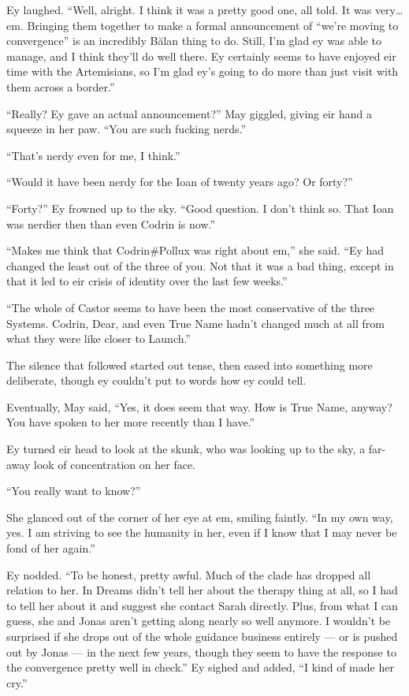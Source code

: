 Ey laughed. ``Well, alright. I think it was a pretty good one, all told. It was very\ldots em. Bringing them together to make a formal announcement of ``we're moving to convergence'' is an incredibly Bălan thing to do. Still, I'm glad ey was able to manage, and I think they'll do well there. Ey certainly seems to have enjoyed eir time with the Artemisians, so I'm glad ey's going to do more than just visit with them across a border.''

``Really? Ey gave an actual announcement?'' May giggled, giving eir hand a squeeze in her paw. ``You are such fucking nerds.''

``That's nerdy even for me, I think.''

``Would it have been nerdy for the Ioan of twenty years ago? Or forty?''

``Forty?'' Ey frowned up to the sky. ``Good question. I don't think so. That Ioan was nerdier then than even Codrin is now.''

``Makes me think that Codrin\#Pollux was right about em,'' she said. ``Ey had changed the least out of the three of you. Not that it was a bad thing, except in that it led to eir crisis of identity over the last few weeks.''

``The whole of Castor seems to have been the most conservative of the three Systems. Codrin, Dear, and even True Name hadn't changed much at all from what they were like closer to Launch.''

The silence that followed started out tense, then eased into something more deliberate, though ey couldn't put to words how ey could tell.

Eventually, May said, ``Yes, it does seem that way. How is True Name, anyway? You have spoken to her more recently than I have.''

Ey turned eir head to look at the skunk, who was looking up to the sky, a far-away look of concentration on her face.

``You really want to know?''

She glanced out of the corner of her eye at em, smiling faintly. ``In my own way, yes. I am striving to see the humanity in her, even if I know that I may never be fond of her again.''

Ey nodded. ``To be honest, pretty awful. Much of the clade has dropped all relation to her. In Dreams didn't tell her about the therapy thing at all, so I had to tell her about it and suggest she contact Sarah directly. Plus, from what I can guess, she and Jonas aren't getting along nearly so well anymore. I wouldn't be surprised if she drops out of the whole guidance business entirely — or is pushed out by Jonas — in the next few years, though they seem to have the response to the convergence pretty well in check.'' Ey sighed and added, ``I kind of made her cry.''

